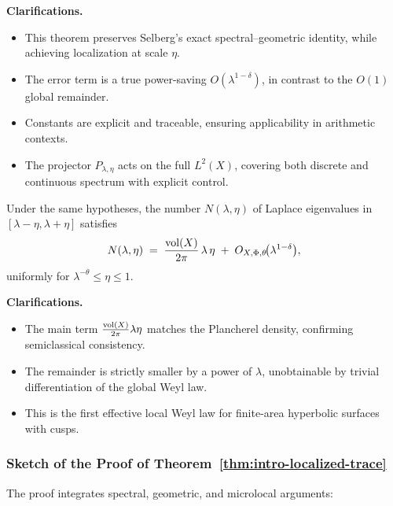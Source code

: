 \medskip

\noindent\textbf{Clarifications.}
\begin{itemize}
  \item This theorem preserves Selberg’s exact spectral–geometric identity,
        while achieving localization at scale $\eta$.
  \item The error term is a true power-saving $O(\lambda^{1-\delta})$,
        in contrast to the $O(1)$ global remainder.
  \item Constants are explicit and traceable, ensuring applicability in arithmetic contexts.
  \item The projector $P_{\lambda,\eta}$ acts on the full $L^2(X)$,
        covering both discrete and continuous spectrum with explicit control.
\end{itemize}

\medskip

\begin{theorem}\label{thm:intro-local-weyl}
Under the same hypotheses,
the number $N(\lambda,\eta)$ of Laplace eigenvalues in $[\lambda-\eta,\lambda+\eta]$
satisfies
\[
  N(\lambda,\eta)
  \;=\;
  \frac{\operatorname{vol}(X)}{2\pi}\,\lambda\,\eta
  \;+\;
  O_{X,\Phi,\theta}\!\big(\lambda^{1-\delta}\big),
\]
uniformly for $\lambda^{-\theta}\le \eta\le 1$.
\end{theorem}

\medskip

\noindent\textbf{Clarifications.}
\begin{itemize}
  \item The main term $\tfrac{\operatorname{vol}(X)}{2\pi}\lambda\eta$ matches the Plancherel density,
        confirming semiclassical consistency.
  \item The remainder is strictly smaller by a power of $\lambda$,
        unobtainable by trivial differentiation of the global Weyl law.
  \item This is the first effective local Weyl law for finite-area hyperbolic surfaces with cusps.
\end{itemize}

\subsubsection*{Sketch of the Proof of Theorem~\ref{thm:intro-localized-trace}}

The proof integrates spectral, geometric, and microlocal arguments:

